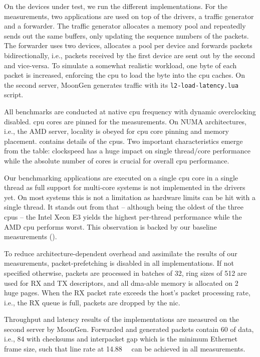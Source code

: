On the devices under test, we run the different implementations. For the
measurements, two applications are used on top of the drivers, a traffic
generator and a forwarder. The traffic generator allocates a memory pool and
repeatedly sends out the same buffers, only updating the sequence numbers of the
packets. The forwarder uses two devices, allocates a pool per device and
forwards packets bidirectionally, i.e., packets received by the first device are
sent out by the second and vice-versa. To simulate a somewhat realistic
workload, one byte of each packet is increased, enforcing the \ac{cpu} to load
the byte into the \ac{cpu} caches. On the second server, MoonGen
\cite{emmerich2015moongen} generates traffic with its
\texttt{l2-load-latency.lua} script.

All benchmarks are conducted at native \ac{cpu} frequency with dynamic
overclocking disabled. \ac{cpu} cores are pinned for the measurements. On NUMA
architectures, i.e., the AMD server, locality is obeyed for \ac{cpu} core
pinning and memory placement.  contains details of the \acp{cpu}.
Two important characteristics emerge from the table: clockspeed has a huge
impact on single thread/core performance while the absolute number of cores is
crucial for overall \ac{cpu} performance.

Our benchmarking applications are executed on a single \ac{cpu} core in a single
thread as full support for multi-core systems is not implemented in the drivers
yet. On most systems this is not a limitation as hardware limits can be hit with
a single thread. It stands out from  that -- although being the
oldest of the three \acp{cpu} -- the Intel Xeon E3 yields the highest per-thread
performance while the AMD \ac{cpu} performs worst. This observation is backed by
our baseline measurements ().

To reduce architecture-dependent overhead and assimilate the results of our
measurements, packet-prefetching is disabled in all implementations. If not
specified otherwise, packets are processed in batches of 32, ring sizes of 512
are used for RX and TX descriptors, and all \ac{dma}-able memory is allocated on
\SI{2}{\mebi\byte} huge pages. When the RX packet rate exceeds the host's packet
processing rate, i.e., the RX queue is full, packets are dropped by the
\ac{nic}.

Throughput and latency results of the implementations are measured on the second
server by MoonGen. Forwarded and generated packets contain \SI{60}{\byte} of
data, i.e., \SI{84}{\byte} with checksums and interpacket gap which is the
minimum Ethernet frame size, such that line rate at \SI{14.88}{\mega\pps} can be
achieved in all measurements.

